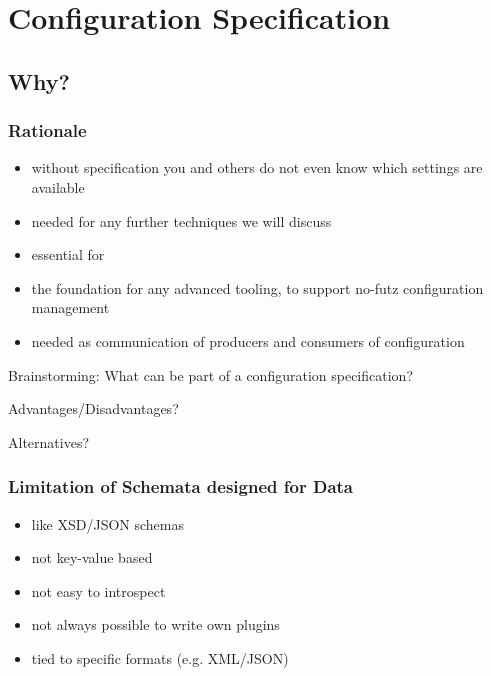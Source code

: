 \section{Configuration Specification}

\subsection{Why?}

\begin{frame}
	\frametitle{Rationale}
	\begin{itemize}
	\item without specification you and others do not even know which settings are available
	\item needed for any further techniques we will discuss
	\pause
	\item essential for ~\citet{holland2001nofutz}
	\item the foundation for any advanced tooling, to support no-futz configuration management
	\pause
	\item needed as communication of producers and consumers of configuration
	\end{itemize}
\end{frame}

\begin{assignment}
	\begin{task}
	Brainstorming: What can be part of a configuration specification?
	\end{task}

	\begin{task}
	Advantages/Disadvantages?
	\end{task}

	\begin{task}
	Alternatives?
	\end{task}
\end{assignment}

\begin{frame}
	\methodQuestion{}
\end{frame}

\begin{frame}
	\frametitle{Limitation of Schemata designed for Data}
	\begin{itemize}
	\item like XSD/JSON schemas
	\pause
	\item not key-value based
	\item not easy to introspect
	\item not always possible to write own plugins
	\item tied to specific formats (e.g. XML/JSON)
	\end{itemize}
\end{frame}

